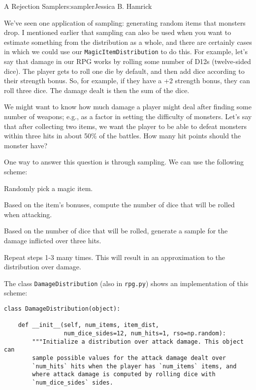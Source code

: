 \begin{aosachapter}{A Rejection Sampler}{s:sampler}{Jessica B. Hamrick}
\label{estimating-attack-damage}

We've seen one application of sampling: generating random items that
monsters drop. I mentioned earlier that sampling can also be used when
you want to estimate something from the distribution as a whole, and
there are certainly cases in which we could use our
\texttt{MagicItemDistribution} to do this. For example, let's say that
damage in our RPG works by rolling some number of D12s (twelve-sided
dice). The player gets to roll one die by default, and then add dice
according to their strength bonus. So, for example, if they have a +2
strength bonus, they can roll three dice. The damage dealt is then the
sum of the dice.

We might want to know how much damage a player might deal after finding
some number of weapons; e.g., as a factor in setting the difficulty of
monsters. Let's say that after collecting two items, we want the player
to be able to defeat monsters within three hits in about 50\% of the
battles. How many hit points should the monster have?

One way to answer this question is through sampling. We can use the
following scheme:

\begin{aosaenumerate}
\def\labelenumi{\arabic{enumi}.}

\item
  Randomly pick a magic item.
\item
  Based on the item's bonuses, compute the number of dice that will be
  rolled when attacking.
\item
  Based on the number of dice that will be rolled, generate a sample for
  the damage inflicted over three hits.
\item
  Repeat steps 1-3 many times. This will result in an approximation to
  the distribution over damage.
\end{aosaenumerate}

\label{implementing-a-distribution-over-damage}

The class \texttt{DamageDistribution} (also in \texttt{rpg.py}) shows an
implementation of this scheme:

\begin{verbatim}
class DamageDistribution(object):

    def __init__(self, num_items, item_dist,
                 num_dice_sides=12, num_hits=1, rso=np.random):
        """Initialize a distribution over attack damage. This object can
        sample possible values for the attack damage dealt over
        `num_hits` hits when the player has `num_items` items, and
        where attack damage is computed by rolling dice with
        `num_dice_sides` sides.


\end{verbatim}
\end{aosachapter}
